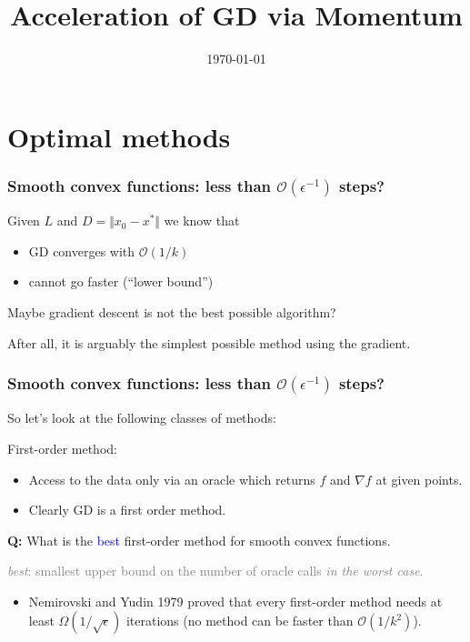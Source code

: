 \documentclass[aspectratio=149]{beamer}
\title{Acceleration of GD via Momentum}
\date{\today}
\begin{document}
\maketitle
\frame{\tableofcontents}

\section{Optimal methods}

\begin{frame}
  \frametitle{Smooth convex functions: less than $\mathcal{O}(\epsilon^{-1})$ steps?}
  Given $L$ and $D=\Vert x_0 - x^* \Vert$ we know that
  \begin{itemize}
    \item GD converges with $\mathcal{O}(1/k)$
    \item cannot go faster (``lower bound'')
  \end{itemize}

  \begin{block}{}
    \centering
    Maybe gradient descent is not the best possible algorithm? \medskip
  \end{block}


  After all, it is arguably the simplest possible method using the gradient.
\end{frame}


\begin{frame}
  \frametitle{Smooth convex functions: less than $\mathcal{O}(\epsilon^{-1})$ steps?}
  So let's look at the following classes of methods:

  First-order method:
  \begin{itemize}
    \item Access to the data only via an oracle which returns $f$ and $\nabla f$ at given points.
    \item Clearly GD is a first order method.
  \end{itemize}

  \begin{block}{}
    \textbf{Q:} What is the \textcolor{blue}{best} first-order method for smooth convex functions.\\
  \end{block}
  \textcolor{gray}{\textit{best}: smallest upper bound on the number of oracle calls \textit{in the worst case}.}

  \begin{itemize}
    \item Nemirovski and Yudin 1979 proved that every first-order method needs at least $\Omega(1/\sqrt{\epsilon})$ iterations (no method can be faster than $\mathcal{O}(1/k^2)$).
  \end{itemize}

\end{frame}
\end{document}
